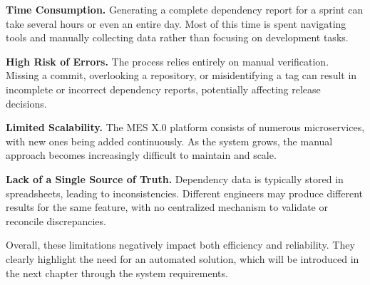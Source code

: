 \vspace{0.2cm}
\textbf{Time Consumption.}
Generating a complete dependency report for a sprint can take several hours or
even an entire day. Most of this time is spent navigating tools and manually
collecting data rather than focusing on development tasks.

\vspace{0.2cm}
\textbf{High Risk of Errors.}
The process relies entirely on manual verification. Missing a commit,
overlooking a repository, or misidentifying a tag can result in incomplete or
incorrect dependency reports, potentially affecting release decisions.

\vspace{0.2cm}
\textbf{Limited Scalability.}
The MES X.0 platform consists of numerous microservices, with new ones being
added continuously. As the system grows, the manual approach becomes increasingly
difficult to maintain and scale.

\vspace{0.2cm}
\textbf{Lack of a Single Source of Truth.}
Dependency data is typically stored in spreadsheets, leading to inconsistencies.
Different engineers may produce different results for the same feature, with no
centralized mechanism to validate or reconcile discrepancies.

\vspace{0.3cm}
Overall, these limitations negatively impact both efficiency and reliability.
They clearly highlight the need for an automated solution, which will be
introduced in the next chapter through the system requirements.
